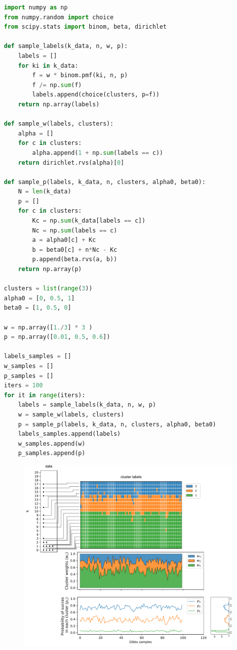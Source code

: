 \begin{lstlisting}[language=python]
import numpy as np
from numpy.random import choice
from scipy.stats import binom, beta, dirichlet

def sample_labels(k_data, n, w, p):
    labels = []
    for ki in k_data:
        f = w * binom.pmf(ki, n, p)
        f /= np.sum(f)
        labels.append(choice(clusters, p=f))
    return np.array(labels)

def sample_w(labels, clusters):
    alpha = []
    for c in clusters:
        alpha.append(1 + np.sum(labels == c))
    return dirichlet.rvs(alpha)[0]

def sample_p(labels, k_data, n, clusters, alpha0, beta0):
    N = len(k_data)
    p = []
    for c in clusters:
        Kc = np.sum(k_data[labels == c])
        Nc = np.sum(labels == c)
        a = alpha0[c] + Kc
        b = beta0[c] + n*Nc - Kc
        p.append(beta.rvs(a, b))
    return np.array(p)

clusters = list(range(3))
alpha0 = [0, 0.5, 1]
beta0 = [1, 0.5, 0]

w = np.array([1./3] * 3 )
p = np.array([0.01, 0.5, 0.6])

labels_samples = []
w_samples = []
p_samples = []
iters = 100
for it in range(iters):
    labels = sample_labels(k_data, n, w, p)
    w = sample_w(labels, clusters)
    p = sample_p(labels, k_data, n, clusters, alpha0, beta0)
    labels_samples.append(labels)
    w_samples.append(w)
    p_samples.append(p)
\end{lstlisting}

\begin{figure}[h]
\centering
\includegraphics[width=\textwidth]{./figs/08-gibbs-binomial-samples.pdf}
\end{figure}

